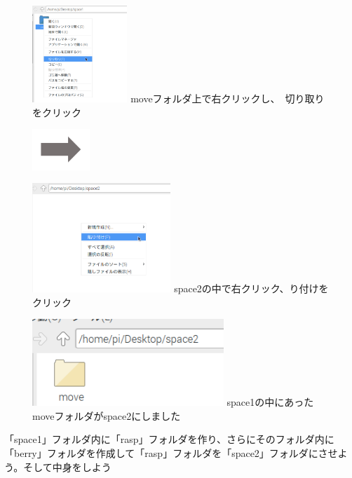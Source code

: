 \documentclass[a4paper,12pt]{jarticle}
\begin{document}
\begin{figure}[ht]
  \centering
  \begin{minipage}{6.589cm}
    \includegraphics[width=3.584cm]{textbook-img048.png}
    {
      moveフォルダ上で右クリックし、　切り取りをクリック
    }
  \end{minipage}
  \includegraphics[width=2.168cm]{textbook-img049.png}
  \begin{minipage}{6.589cm}
    \includegraphics[width=5.225cm]{textbook-img046.png}
    {
      space2の中で右クリック、り付けをクリック
    }
  \end{minipage}

  \begin{minipage}{6.589cm}
    \includegraphics[width=7.218cm]{textbook-img045.png}
    {
      space1の中にあったmoveフォルダがspace2にしました
    }
  \end{minipage}


\end{figure}


\theQuestion\label{Q:hasAnswer02-2}
「space1」フォルダ内に「rasp」フォルダを作り、さらにそのフォルダ内に「berry」フォルダを作成して「rasp」フォルダを「space2」フォルダにさせよう。そして中身をしよう
\end{document}
